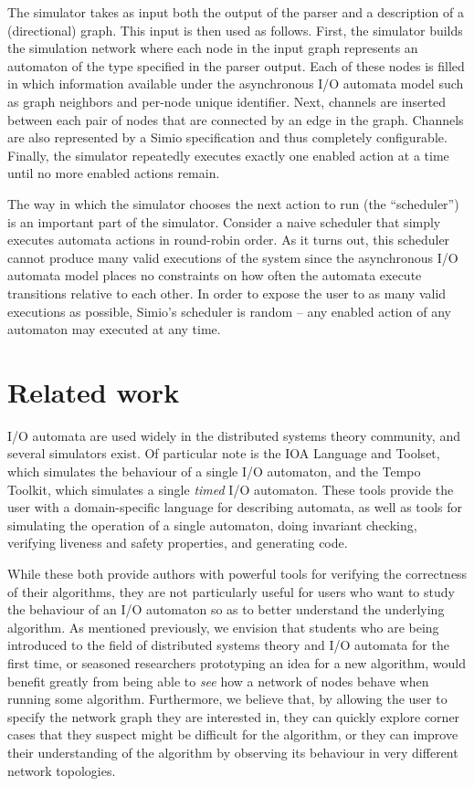 \documentclass{scrartcl}
\begin{document}
The simulator takes as input both the output of the parser and a description of
a (directional) graph.
This input is then used as follows.
First, the simulator builds the simulation network where each node in the input
graph represents an automaton of the type specified in the parser output.
Each of these nodes is filled in which information available under the
asynchronous I/O automata model such as graph neighbors and per-node unique
identifier.
Next, channels are inserted between each pair of nodes that are connected by an
edge in the graph.
Channels are also represented by a Simio specification and thus completely
configurable.
Finally, the simulator repeatedly executes exactly one enabled action at a time
until no more enabled actions remain.

The way in which the simulator chooses the next action to run (the
``scheduler'') is an important part of the simulator.
Consider a naive scheduler that simply executes automata actions in round-robin
order.
As it turns out, this scheduler cannot produce many valid executions of the
system since the asynchronous I/O automata model places no constraints on how
often the automata execute transitions relative to each other.
In order to expose the user to as many valid executions as possible, Simio's
scheduler is random -- any enabled action of any automaton may executed at any
time.

\section{Related work}

I/O automata are used widely in the distributed systems theory community, and
several simulators exist. Of particular note is the IOA Language and
Toolset\cite{ioa}, which simulates the behaviour of a single I/O automaton, and
the Tempo Toolkit\cite{tempo}, which simulates a single \textit{timed} I/O
automaton. These tools provide the user with a domain-specific language for
describing automata, as well as tools for simulating the operation of a single
automaton, doing invariant checking, verifying liveness and safety properties,
and generating code.

While these both provide authors with powerful tools for verifying the
correctness of their algorithms, they are not particularly useful for users who
want to study the behaviour of an I/O automaton so as to better understand the
underlying algorithm. As mentioned previously, we envision that students who
are being introduced to the field of distributed systems theory and I/O
automata for the first time, or seasoned researchers prototyping an idea for a
new algorithm, would benefit greatly from being able to \textit{see} how a
network of nodes behave when running some algorithm. Furthermore, we believe
that, by allowing the user to specify the network graph they are interested in,
they can quickly explore corner cases that they suspect might be difficult for
the algorithm, or they can improve their understanding of the algorithm by
observing its behaviour in very different network topologies.
\end{document}
